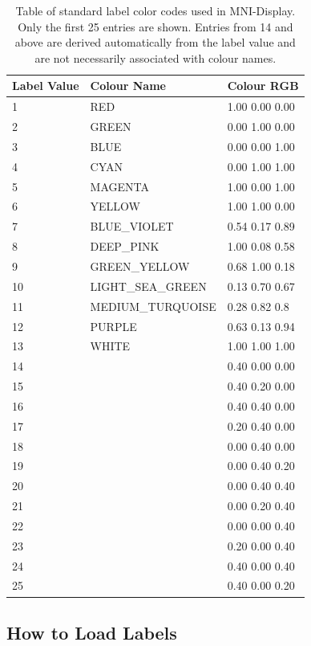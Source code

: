 \documentclass[11pt,letterpaper]{article}
\newcommand{\display}{\mbox{MNI-Display}}
\begin{document}
\begin{table}
\centering
\caption{Table of standard label color codes used in \display{}. Only
 the first 25 entries are shown. Entries from 14 and above are
 derived automatically from the label value and are not necessarily associated
with colour names.}
\begin{small}
\begin{tabular}{l|l|l}
Label Value & Colour Name & Colour RGB \\
\hline
1 & RED & 1.00 0.00 0.00 \\
2 & GREEN & 0.00 1.00 0.00 \\
3 & BLUE & 0.00 0.00 1.00 \\
4 & CYAN & 0.00 1.00 1.00\\
5 & MAGENTA & 1.00 0.00 1.00 \\
6 & YELLOW & 1.00 1.00 0.00 \\
7 & BLUE\_VIOLET & 0.54 0.17 0.89 \\
8 & DEEP\_PINK & 1.00 0.08 0.58 \\
9 & GREEN\_YELLOW & 0.68 1.00 0.18 \\
10 & LIGHT\_SEA\_GREEN & 0.13 0.70 0.67 \\
11 & MEDIUM\_TURQUOISE & 0.28 0.82 0.8 \\
12 & PURPLE & 0.63 0.13 0.94 \\
13 & WHITE & 1.00 1.00 1.00 \\
14 & & 0.40 0.00 0.00 \\
15 & & 0.40 0.20 0.00 \\
16 & & 0.40 0.40 0.00 \\
17 & & 0.20 0.40 0.00 \\
18 & & 0.00 0.40 0.00 \\
19 & & 0.00 0.40 0.20 \\
20 & & 0.00 0.40 0.40 \\
21 & & 0.00 0.20 0.40 \\
22 & & 0.00 0.00 0.40 \\
23 & & 0.20 0.00 0.40 \\
24 & & 0.40 0.00 0.40 \\
25 & & 0.40 0.00 0.20 \\
\hline
\end{tabular}
\end{small}
\label{tabLabCol}
\end{table}

\subsection{How to Load Labels}
\end{document}
